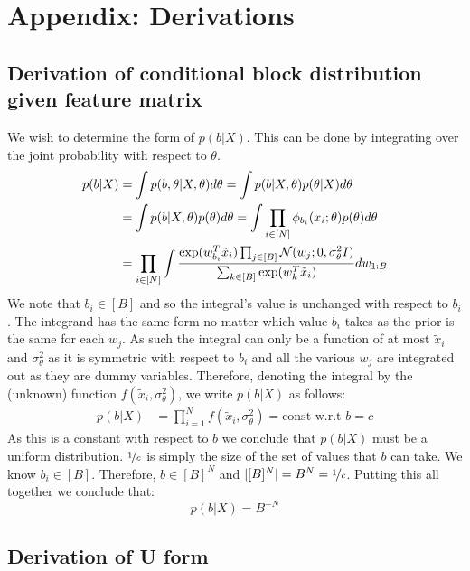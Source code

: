 \section{Appendix: Derivations}

\subsection{Derivation of conditional block distribution given feature matrix}
\label{appdx:b|x}

We wish to determine the form of $p(b| X)$. This can be done by integrating over the joint probability with respect to $\theta$.
%
\begin{align*}
	p(b | X) &= \int p(b , \theta| X, \theta) d\theta = \int p(b | X, \theta) p(\theta | X) d\theta \\
	&=\int p(b | X, \theta) p(\theta) d\theta = \int \prod_{i \in [N] } \phi_{b_i}(x_i; \theta) p(\theta) d\theta \\
	&= \prod_{i \in [N]} \int \frac{\exp(w_{b_i}^T \tilde{x}_i) \prod_{j \in [B]} \mathcal{N}(w_j; 0, \sigma_\theta^2 I)}{\sum_{k \in [B]} \exp(w_{k}^T \tilde{x}_i)} dw_{1:B}
\end{align*}
%
We note that $b_i \in [B]$ and so the integral's value is unchanged with respect to $b_i$. The integrand has the same form no matter which value $b_i$ takes as the prior is the same for each $w_j$. As such the integral can only be a function of at most $\tilde{x}_i$ and $\sigma_\theta^2$ as it is symmetric with respect to $b_i$ and all the various $w_j$ are integrated out as they are dummy variables. Therefore, denoting the integral by the (unknown) function $f(\tilde{x}_i, \sigma_\theta^2)$, we write $p(b| X)$ as follows:
%
\begin{align*}
	p(b | X) &= \prod_{i=1}^{N} f(\tilde{x}_i, \sigma_\theta^2) = \textrm{const w.r.t } b = c
\end{align*}
%
As this is a constant with respect to $b$ we conclude that $p(b | X)$ must be a uniform distribution. $\nicefrac{1}{c}$ is simply the size of the set of values that $b$ can take. We know $b_i \in [B]$. Therefore, $b \in [B]^N$ and $|[B]^N| = B^N = \nicefrac{1}{c}$. Putting this all together we conclude that:
%
\begin{equation}
	p(b | X) = B^{-N}
\end{equation}

\subsection{Derivation of U form}
\label{appdx:form-U}

